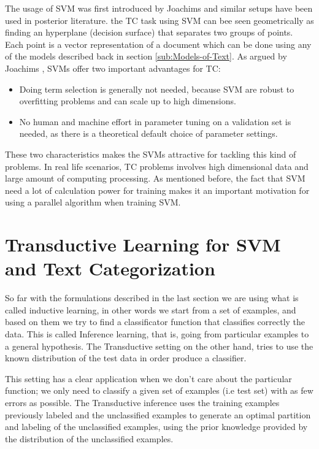 The usage of SVM was first introduced by Joachims \cite{Joachims98,Joachims99c}
and similar setups have been used in posterior literature\cite{DumaisPHS98}.
the TC task using SVM can bee seen geometrically as finding an hyperplane
(decision surface) that separates two groups of points. Each point
is a vector representation of a document which can be done using any
of the models described back in section \ref{sub:Models-of-Text}.
As argued by Joachims \cite{Joachims98}, SVMs offer two important
advantages for TC:

\begin{itemize}
\item Doing term selection is generally not needed, because SVM are robust
to overfitting problems and can scale up to high dimensions.
\item No human and machine effort in parameter tuning on a validation set
is needed, as there is a theoretical default choice of parameter settings.
\end{itemize}
These two characteristics makes the SVMs attractive for tackling this
kind of problems. In real life scenarios, TC problems involves high
dimensional data and large amount of computing processing. As mentioned
before, the fact that SVM need a lot of calculation power for training
makes it an important motivation for using a parallel algorithm when
training SVM.


\section{Transductive Learning for SVM and Text Categorization\label{sub:Transductive-Learning-for}}

So far with the formulations described in the last section we are
using what is called inductive learning, in other words we start from
a set of examples, and based on them we try to find a classificator
function that classifies correctly the data. This is called Inference
learning, that is, going from particular examples to a general hypothesis.
The Transductive setting on the other hand, tries to use the known
distribution of the test data in order produce a classifier. 

This setting has a clear application when we don\textquoteright{}t
care about the particular function; we only need to classify a given
set of examples (i.e test set) with as few errors as possible. The
Transductive inference uses the training examples previously labeled
and the unclassified examples to generate an optimal partition and
labeling of the unclassified examples, using the prior knowledge provided
by the distribution of the unclassified examples.


